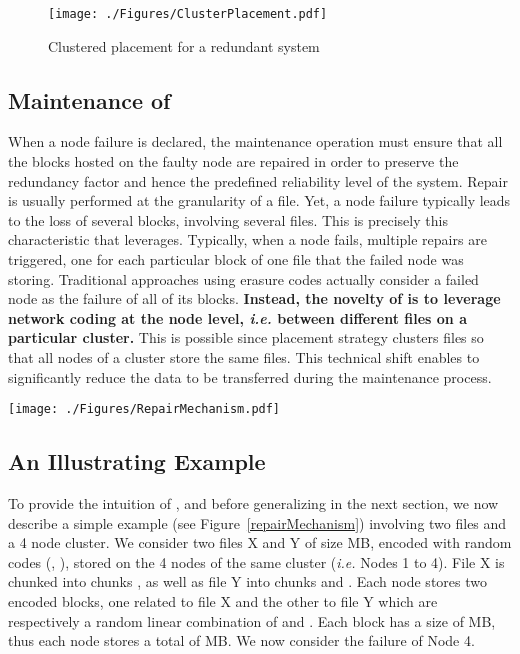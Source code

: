 \begin{figure}[t]    
\vspace{-0.8cm}
  \begin{center}    
 \texttt{[image: ./Figures/ClusterPlacement.pdf]} 
  \caption{Clustered placement for a  redundant system}  
   \label{clusterPlacement}    
\end{center}     
   \end{figure}

\subsection{Maintenance of \crc}

When a node failure is declared, the maintenance operation must ensure that all the blocks hosted on the faulty node are repaired in order to preserve the redundancy factor and hence the predefined reliability level of the system. Repair is usually performed at the granularity of a file. Yet, a node failure typically leads to the loss of several blocks, involving several files. This is precisely this characteristic that \crc leverages. Typically, when a node fails,  multiple repairs are triggered, one for each particular block of one file that the failed node was storing.  Traditional approaches using erasure codes actually consider a failed node as the failure of all of its blocks.   \textbf{Instead, the novelty of \crc is to leverage network coding at the node level, \textit{i.e.} between different files on a particular cluster.} This is possible since \crc placement strategy clusters files so that all nodes of a cluster store the same files.  This technical shift enables to significantly reduce the data to be transferred during the maintenance process.

\begin{figure*}[t!] 
 \begin{center}    
 \texttt{[image: ./Figures/RepairMechanism.pdf]} 
    \caption{Example of a \crc repair process, for the repair of a new node in a cluster of  (with ).}   
    \label{repairMechanism}   
  \end{center}     
   \end{figure*}
   
\subsection{An Illustrating Example}
To provide the intuition of \crc, and before generalizing in the next
section, we now describe a simple example (see
Figure~\ref{repairMechanism}) involving  two files and a 4 node
cluster.  We consider two files X and Y of size  MB, encoded with
random codes (, ), stored on the 4 nodes of the same cluster
(\textit{i.e.} Nodes 1 to 4). File X is chunked into  chunks ,  as well as file Y into chunks  and . Each node stores two encoded blocks, one related to file X and the other to file Y which are respectively a random linear combination of  and . Each block has a size of  MB, thus each
node stores a total of  MB.  We now consider the
failure of Node 4.

